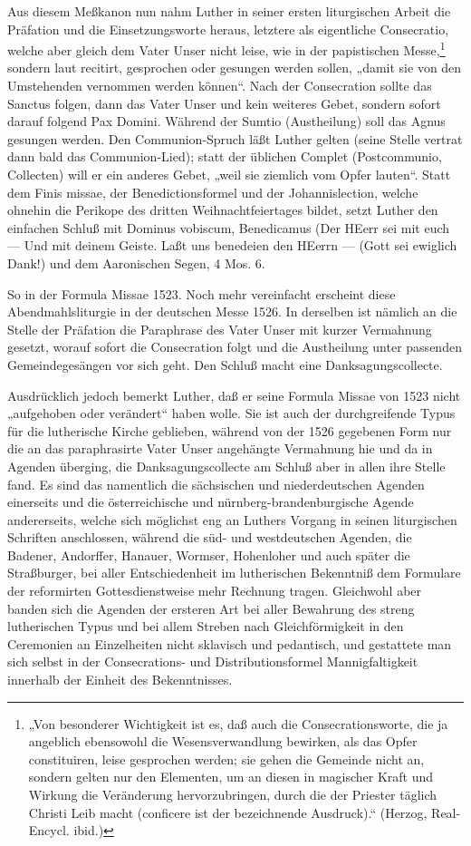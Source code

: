 Aus diesem Meßkanon nun nahm Luther in seiner ersten liturgischen Arbeit die Präfation und die Einsetzungsworte heraus, letztere als eigentliche Consecratio, welche aber gleich dem Vater Unser nicht leise, wie in der papistischen Messe,\footnote{„Von besonderer Wichtigkeit ist es, daß auch die Consecrationsworte, die ja angeblich ebensowohl die Wesensverwandlung bewirken, als das Opfer constituiren, leise gesprochen werden; sie gehen die Gemeinde nicht an, sondern gelten nur den Elementen, um an diesen in magischer Kraft und Wirkung die Veränderung hervorzubringen, durch die der Priester täglich Christi Leib macht (conficere ist der bezeichnende Ausdruck).“ (Herzog, Real-Encycl. ibid.)} sondern laut recitirt, gesprochen oder gesungen werden sollen, „damit sie von den Umstehenden vernommen werden können“. Nach der Consecration sollte das Sanctus folgen, dann das Vater Unser und kein weiteres Gebet, sondern sofort darauf folgend Pax Domini. Während der Sumtio (Austheilung) soll das Agnus gesungen werden. Den Communion-Spruch läßt Luther gelten (seine Stelle vertrat dann bald das Communion-Lied); statt der üblichen Complet (Postcommunio, Collecten) will er ein anderes Gebet, „weil sie ziemlich vom Opfer lauten“. Statt dem Finis missae, der Benedictionsformel und der Johannislection, welche ohnehin die Perikope des dritten Weihnachtfeiertages bildet, setzt Luther den einfachen Schluß mit Dominus vobiscum, Benedicamus (Der HEerr sei mit euch — Und mit deinem Geiste.
Laßt uns benedeien den HEerrn — (Gott sei ewiglich Dank!) und dem Aaronischen Segen, 4 Mos. 6.

So in der Formula Missae 1523. Noch mehr vereinfacht erscheint diese Abendmahlsliturgie in der deutschen Messe 1526. In derselben ist nämlich an die Stelle der Präfation die Paraphrase des Vater Unser mit kurzer Vermahnung gesetzt, worauf sofort die Consecration folgt und die Austheilung unter passenden Gemeindegesängen vor sich geht. Den Schluß macht eine Danksagungscollecte.

Ausdrücklich jedoch bemerkt Luther, daß er seine Formula Missae von 1523 nicht „aufgehoben oder verändert“ haben wolle. Sie ist auch der durchgreifende Typus für die lutherische Kirche geblieben, während von der 1526 gegebenen Form nur die an das paraphrasirte Vater Unser angehängte Vermahnung hie und da in Agenden überging, die Danksagungscollecte am Schluß aber in allen ihre Stelle fand. Es sind das namentlich die sächsischen und niederdeutschen Agenden einerseits und die österreichische und nürnberg-brandenburgische Agende andererseits, welche sich möglichst eng an Luthers Vorgang in seinen liturgischen Schriften anschlossen, während die süd- und westdeutschen Agenden, die Badener, Andorffer, Hanauer, Wormser, Hohenloher und auch später die Straßburger, bei aller Entschiedenheit im lutherischen Bekenntniß dem Formulare der reformirten Gottesdienstweise mehr Rechnung tragen. Gleichwohl aber banden sich die Agenden der ersteren Art bei aller Bewahrung des streng lutherischen Typus und bei allem Streben nach Gleichförmigkeit in den Ceremonien an Einzelheiten nicht sklavisch und pedantisch, und gestattete man sich selbst in der Consecrations- und Distributionsformel Mannigfaltigkeit innerhalb der Einheit des Bekenntnisses.

